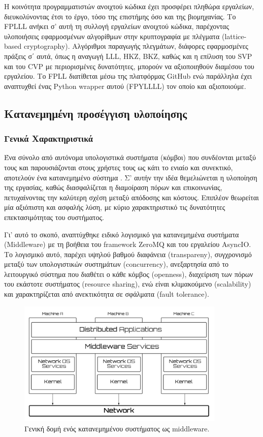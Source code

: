 Η κοινότητα προγραμματιστών ανοιχτού κώδικα έχει προσφέρει πληθώρα εργαλείων, διευκολύνοντας έτσι το έργο, τόσο της επιστήμης όσο και της βιομηχανίας. Το FPLLL ανήκει σ' αυτή τη συλλογή εργαλείων ανοιχτού κώδικα, παρέχοντας υλοποιήσεις εφαρμοσμένων αλγορίθμων στην κρυπτογραφία με πλέγματα (lattice-based cryptography). Αλγόριθμοι παραγωγής πλεγμάτων, διάφορες εφαρμοσμένες πράξεις σ΄ αυτά, όπως η αναγωγή LLL, HKZ, BKZ, καθώς και η επίλυση του SVP και του CVP με περιορισμένες δυνατότητες, μπορούν να αξιοποιηθούν διαμέσου του εργαλείου. Το FPLL διατίθεται μέσω της πλατφόρμας GitHub ενώ παράλληλα έχει αναπτυχθεί ένας Python wrapper αυτού (FPYLLLL) τον οποίο και αξιοποιούμε. 


\subsection{Κατανεμημένη προσέγγιση υλοποίησης}

\subsubsection{ Γενικά Χαρακτηριστικά}

Ένα σύνολο από αυτόνομα υπολογιστικά συστήματα (κόμβοι) που συνδέονται μεταξύ τους και παρουσιάζονται στους χρήστες τους ως κάτι το ενιαίο και συνεκτικό, αποτελούν ένα κατανεμημένο σύστημα \cite{DistributedSystems}. Σ' αυτήν την ιδέα θεμελιώνεται η υλοποίηση της εργασίας, καθώς διασφαλίζεται η διαμοίραση πόρων και επικοινωνίας, πετυχαίνοντας την καλύτερη σχέση μεταξύ απόδοσης και κόστους. Επιπλέον θεωρείται μία αξιόπιστη και ασφαλής λύση, με κύριο χαρακτηριστικό τις δυνατότητες επεκτασιμότητας του συστήματος. 

Γι' αυτό το σκοπό, αναπτύχθηκε ειδικό λογισμικό για κατανεμημένα συστήματα (Middleware) με τη βοήθεια του framework ZeroMQ και του εργαλείου AsyncIO. Το λογισμικό αυτό, παρέχει υψηλού βαθμού διαφάνεια (transpareny), συγχρονισμό μεταξύ των υπολογιστικών συστημάτων (concurrency), ανεξαρτησία από το λειτουργικό σύστημα που διαθέτει ο κάθε κόμβος (openness), διαχείριση των πόρων του εκάστοτε συστήματος (resource sharing), ενώ είναι κλιμακούμενο (scalability) και χαρακτηρίζεται από ανεκτικότητα σε σφάλματα (fault tolerance). 
 

 \begin{figure}[!htbp]
\centering
\includegraphics[width=0.8\linewidth,height=6cm]{pictures/midleware_repr_new_new.png}
\caption{Γενική δομή ενός κατανεμημένου συστήματος ως middleware.}
\label{fig:middleware}       
\end{figure}
 
